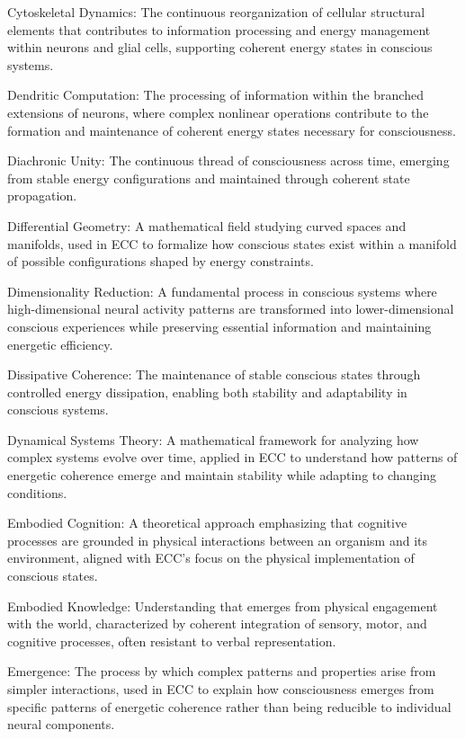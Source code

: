 Cytoskeletal Dynamics: The continuous reorganization of cellular structural elements that contributes to information processing and energy management within neurons and glial cells, supporting coherent energy states in conscious systems.

Dendritic Computation: The processing of information within the branched extensions of neurons, where complex nonlinear operations contribute to the formation and maintenance of coherent energy states necessary for consciousness.

Diachronic Unity: The continuous thread of consciousness across time, emerging from stable energy configurations and maintained through coherent state propagation.

Differential Geometry: A mathematical field studying curved spaces and manifolds, used in ECC to formalize how conscious states exist within a manifold of possible configurations shaped by energy constraints.

Dimensionality Reduction: A fundamental process in conscious systems where high-dimensional neural activity patterns are transformed into lower-dimensional conscious experiences while preserving essential information and maintaining energetic efficiency.

Dissipative Coherence: The maintenance of stable conscious states through controlled energy dissipation, enabling both stability and adaptability in conscious systems.

Dynamical Systems Theory: A mathematical framework for analyzing how complex systems evolve over time, applied in ECC to understand how patterns of energetic coherence emerge and maintain stability while adapting to changing conditions.

Embodied Cognition: A theoretical approach emphasizing that cognitive processes are grounded in physical interactions between an organism and its environment, aligned with ECC's focus on the physical implementation of conscious states.

Embodied Knowledge: Understanding that emerges from physical engagement with the world, characterized by coherent integration of sensory, motor, and cognitive processes, often resistant to verbal representation.

Emergence: The process by which complex patterns and properties arise from simpler interactions, used in ECC to explain how consciousness emerges from specific patterns of energetic coherence rather than being reducible to individual neural components.

